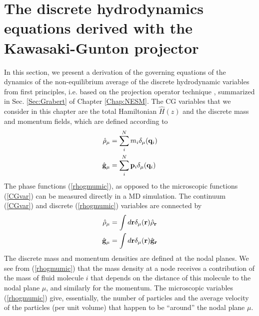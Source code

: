\documentclass[b5paper,openright,11pt]{book}
\begin{document}
\section{The  discrete hydrodynamics equations derived
with the Kawasaki-Gunton projector}
\label{Sec:derivation}
In this section, we present a derivation of the governing equations of
the  dynamics   of  the   non-equilibrium  average  of   the  discrete
hydrodynamic  variables  from first  principles,  i.e.   based on  the
projection operator  technique \cite{Grabert1982}, summarized  in Sec.
\ref{Sec:Grabert} of Chapter \ref{Chap:NESM}.   The CG variables that we
consider in this chapter are the  total Hamiltonian $\hat{H}(z)$
and the discrete mass and momentum fields, which are defined according to
\begin{align}
\hat{\rho}_\mu&= \sum_i^Nm_i\delta_\mu({\bf q}_i)
\nonumber\\
\hat{\bf g}_\mu&= \sum_i^N{\bf p}_i\delta_\mu({\bf q}_i)
\label{rhogmumic}
\end{align}
The  phase  functions (\ref{rhogmumic}),  as  opposed  to  the  microscopic  functions
(\ref{CGvar}) can be  measured directly in a  MD simulation. The
continuum (\ref{CGvar}) and discrete (\ref{rhogmumic}) variables
are connected by
\begin{align}
\hat{\rho}_\mu&= \int d{\bf r}\delta_\mu({\bf r})\hat{\rho}_{\bf r}
\nonumber\\
\hat{\bf g}_\mu&=\int d{\bf r}\delta_\mu({\bf r})\hat{\bf g}_{\bf r}
\label{rhogmumiccont}
\end{align}
The  discrete mass  and momentum  densities are  defined at  the nodal
planes. We see from (\ref{rhogmumic}) that  the mass density at a node
receives a contribution of the mass of fluid molecule $i$ that depends
on  the distance  of  this  molecule to  the  nodal  plane $\mu$,  and
similarly    for   the    momentum.     The   microscopic    variables
(\ref{rhogmumic}) give,  essentially, the number of  particles and the
average velocity of the particles (per  unit volume) that happen to be
``around'' the nodal plane $\mu$.
\end{document}
